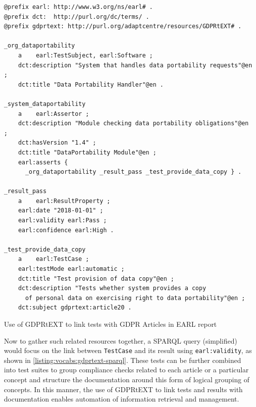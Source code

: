 \begin{listing}
\begin{verbatim}
@prefix earl: http://www.w3.org/ns/earl# .
@prefix dct:  http://purl.org/dc/terms/ .
@prefix gdprtext: http://purl.org/adaptcentre/resources/GDPRtEXT# .

_org_dataportability
    a    earl:TestSubject, earl:Software ;
    dct:description "System that handles data portability requests"@en ;
    dct:title "Data Portability Handler"@en .

_system_dataportability
    a    earl:Assertor ;
    dct:description "Module checking data portability obligations"@en ;
    dct:hasVersion "1.4" ;
    dct:title "DataPortability Module"@en ;
    earl:asserts { 
      _org_dataportability _result_pass _test_provide_data_copy } .

_result_pass
    a    earl:ResultProperty ;
    earl:date "2018-01-01" ;
    earl:validity earl:Pass ;
    earl:confidence earl:High .

_test_provide_data_copy
    a    earl:TestCase ;
    earl:testMode earl:automatic ;
    dct:title "Test provision of data copy"@en ;
    dct:description "Tests whether system provides a copy 
      of personal data on exercising right to data portability"@en ;
    dct:subject gdprtext:article20 .
\end{verbatim}
\label{listing:vocab:gdprtext-earl}
\caption{Use of GDPRtEXT to link tests with GDPR Articles in EARL report}
\end{listing}

Now to gather such related resources together, a SPARQL query (simplified) would focus on the link between \texttt{TestCase} and its result using \texttt{earl:validity}, as shown in \autoref{listing:vocabs:gdprtext-sparql}.
These tests can be further combined into test suites to group compliance checks related to each article or a particular concept and structure the documentation around this form of logical grouping of concepts.
In this manner, the use of GDPRtEXT to link tests and results with documentation enables automation of information retrieval and management.

